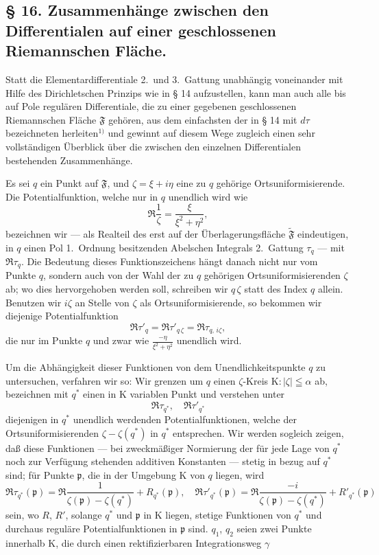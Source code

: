 \documentclass{article}
\begin{document}
\subsection*{§ 16. Zusammenhänge zwischen den Differentialen auf einer geschlossenen Riemannschen Fläche.}

Statt die Elementardifferentiale 2.\ und 3.\ Gattung unabhängig voneinander mit Hilfe des Dirichletschen Prinzips wie in § 14 aufzustellen, kann man auch alle bis auf Pole regulären Differentiale, die zu einer gegebenen geschlossenen Riemannschen Fläche $\mathfrak{F}$ gehören, aus dem einfachsten der in § 14 mit $d\tau$ bezeichneten herleiten${}^{1)}$ und gewinnt auf diesem Wege zugleich einen sehr vollständigen Überblick über die zwischen den einzelnen Differentialen bestehenden Zusammenhänge.

Es sei $q$ ein Punkt auf $\mathfrak{F}$, und $\zeta = \xi + i\eta$ eine zu $q$ gehörige Ortsuniformisierende. Die Potentialfunktion, welche nur in $q$ unendlich wird wie
\[ \Re \frac{1}{\zeta} = \frac{\xi}{\xi^2 + \eta^2}, \]
bezeichnen wir --- als Realteil des erst auf der Überlagerungsfläche $\tilde{\mathfrak{F}}$ eindeutigen, in $q$ einen Pol 1.\ Ordnung besitzenden Abelschen Integrals 2.\ Gattung $\tau_q$ --- mit $\Re\tau_q$. Die Bedeutung dieses Funktionszeichens hängt danach nicht nur vom Punkte $q$, sondern auch von der Wahl der zu $q$ gehörigen Ortsuniformisierenden $\zeta$ ab; wo dies hervorgehoben werden soll, schreiben wir $q\,\zeta$ statt des Index $q$ allein. Benutzen wir $i\zeta$ an Stelle von $\zeta$ als Ortsuniformisierende, so bekommen wir diejenige Potentialfunktion
\[ \Re\tau'_q = \Re\tau'_{q\,\zeta} = \Re\tau_{q,\,i\zeta}, \]
die nur im Punkte $q$ und zwar wie $\frac{-\eta}{\xi^2 + \eta^2}$ unendlich wird.

Um die Abhängigkeit dieser Funktionen von dem Unendlichkeitspunkte $q$ zu untersuchen, verfahren wir so: Wir grenzen um $q$ einen $\zeta$-Kreis $\mathrm{K}\colon |\zeta| \leqq \alpha$ ab, bezeichnen mit $q^*$ einen in $\mathrm{K}$ variablen Punkt und verstehen unter
\[ \Re\tau_{q^*}, \quad \Re\tau'_{q^*} \]
diejenigen in $q^*$ unendlich werdenden Potentialfunktionen, welche der Ortsuniformisierenden $\zeta - \zeta(q^*)$ in $q^*$ entsprechen. Wir werden sogleich zeigen, daß diese Funktionen --- bei zweckmäßiger Normierung der für jede Lage von $q^*$ noch zur Verfügung stehenden additiven Konstanten --- stetig in bezug auf $q^*$ sind; für Punkte $\mathfrak{p}$, die in der Umgebung $\mathrm{K}$ von $q$ liegen, wird
\[ \Re\tau_{q^*}(\mathfrak{p}) = \Re \frac{1}{\zeta(\mathfrak{p}) - \zeta(q^*)} + R_{q^*}(\mathfrak{p}), \quad \Re\tau'_{q^*}(\mathfrak{p}) = \Re \frac{-i}{\zeta(\mathfrak{p}) - \zeta(q^*)} + R'_{q^*}(\mathfrak{p}) \tag{34} \]
sein, wo $R$, $R'$, solange $q^*$ und $\mathfrak{p}$ in $\mathrm{K}$ liegen, stetige Funktionen von $q^*$ und durchaus reguläre Potentialfunktionen in $\mathfrak{p}$ sind. $q_1$, $q_2$ seien zwei Punkte innerhalb $\mathrm{K}$, die durch einen rektifizierbaren Integrationsweg $\gamma$
\end{document}
